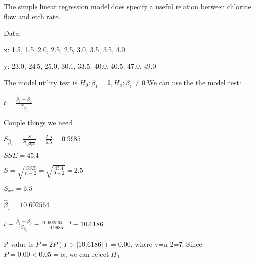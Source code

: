 \documentclass{article}
\begin{document}
\vspace{2mm}


The simple linear regression model does specify a useful relation between  chlorine flow and etch rate.
\vspace{2mm}

Data: 

\vspace{2mm}

x: 1.5, 1.5, 2.0, 2.5, 2.5, 3.0, 3.5, 3.5, 4.0

\vspace{2mm}

y: 23.0, 24.5, 25.0, 30.0, 33.5, 40.0, 40.5, 47.0, 49.0

\vspace{2mm}


The model utility test is $H_{0}: \beta_{1}=0, H_{a}: \beta_{1} \ne 0$ We can use the the model test: 

\vspace{2mm}

$t=\frac{\hat{\beta}_{1}-\beta_{0}}{S_{\hat{\beta}_{1}}}=$


Couple things we need: 

\vspace{2mm}

$S_{\hat{\beta}_{1}}=\frac{S}{S_{\sqrt{S_xx}}}=\frac{2.5}{6.5}=0.9985$

\vspace{2mm}

$SSE=45.4$

\vspace{2mm}

$S=\sqrt{\frac{SSE}{n-2}}=\sqrt{\frac{45.4}{9-2}}=2.5$

\vspace{2mm}

$S_{xx}=6.5$

\vspace{2mm}


$\hat{\beta}_{1}=10.602564$

\vspace{2mm}


$t=\frac{\hat{\beta}_{1}-\beta_{0}}{S_{\hat{\beta}_{1}}}=\frac{10.602564-0}{0.9985}=10.6186$

\vspace{2mm}

P-value is $P=2P(T> |10.6186|)=0.00$, where v=n-2=7. Since $P=0.00 < 0.05=\alpha$, we can reject $H_{0}$
\end{document}
